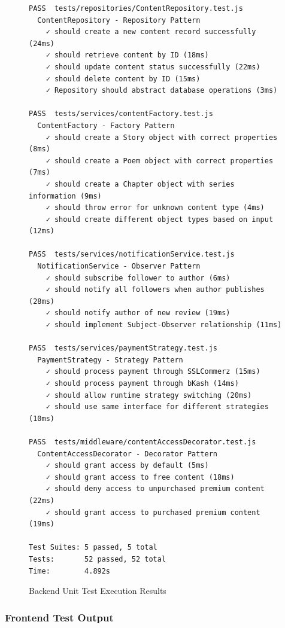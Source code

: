 \begin{figure}[h]
\centering
\begin{tcolorbox}[colback=black!5!white,colframe=green!75!black,title=Backend Test Results]
\begin{verbatim}
PASS  tests/repositories/ContentRepository.test.js
  ContentRepository - Repository Pattern
    ✓ should create a new content record successfully (24ms)
    ✓ should retrieve content by ID (18ms)
    ✓ should update content status successfully (22ms)
    ✓ should delete content by ID (15ms)
    ✓ Repository should abstract database operations (3ms)

PASS  tests/services/contentFactory.test.js
  ContentFactory - Factory Pattern
    ✓ should create a Story object with correct properties (8ms)
    ✓ should create a Poem object with correct properties (7ms)
    ✓ should create a Chapter object with series information (9ms)
    ✓ should throw error for unknown content type (4ms)
    ✓ should create different object types based on input (12ms)

PASS  tests/services/notificationService.test.js
  NotificationService - Observer Pattern
    ✓ should subscribe follower to author (6ms)
    ✓ should notify all followers when author publishes (28ms)
    ✓ should notify author of new review (19ms)
    ✓ should implement Subject-Observer relationship (11ms)

PASS  tests/services/paymentStrategy.test.js
  PaymentStrategy - Strategy Pattern
    ✓ should process payment through SSLCommerz (15ms)
    ✓ should process payment through bKash (14ms)
    ✓ should allow runtime strategy switching (20ms)
    ✓ should use same interface for different strategies (10ms)

PASS  tests/middleware/contentAccessDecorator.test.js
  ContentAccessDecorator - Decorator Pattern
    ✓ should grant access by default (5ms)
    ✓ should grant access to free content (18ms)
    ✓ should deny access to unpurchased premium content (22ms)
    ✓ should grant access to purchased premium content (19ms)

Test Suites: 5 passed, 5 total
Tests:       52 passed, 52 total
Time:        4.892s
\end{verbatim}
\end{tcolorbox}
\caption{Backend Unit Test Execution Results}
\label{fig:backend-tests}
\end{figure}

\subsubsection{Frontend Test Output}

